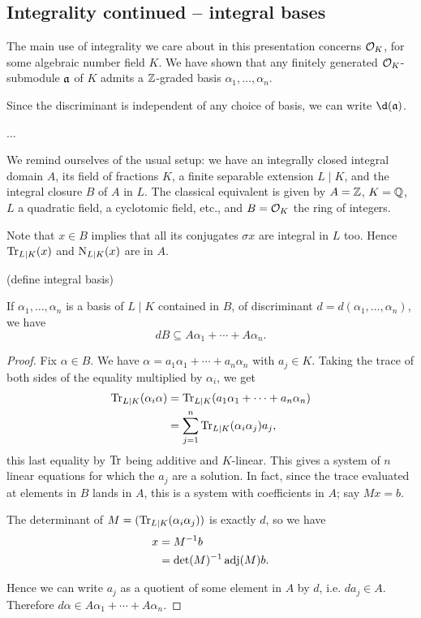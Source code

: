 \subsection{Integrality continued -- integral bases}


The main use of integrality we care about in this presentation concerns $\mathcal{O}_K$, for some algebraic number field $K$. We have shown that any finitely generated $\mathcal{O}_K$-submodule $\mathfrak{a}$ of $K$ admits a $\mathbb{Z}$-graded basis $\alpha_1,\dots,\alpha_n$.

Since the discriminant is independent of any choice of basis, we can write $\d(\fraka)$.

...

We remind ourselves of the usual setup: we have an integrally closed integral domain $A$, its field of fractions $K$, a finite separable extension $L\mid K$, and the integral closure $B$ of $A$ in $L$. The classical equivalent is given by $A=\mathbb{Z}$, $K=\mathbb{Q}$, $L$ a quadratic field, a cyclotomic field, etc., and $B=\mathcal{O}_K$ the ring of integers.

Note that $x\in B$ implies that all its conjugates $\sigma x$ are integral in $L$ too. Hence $\operatorname{Tr}_{L\mid K}(x)$ and $\operatorname{N}_{L\mid K}(x)$ are in $A$.

(define integral basis)

\begin{lemma}
	If $\alpha_1,\dots,\alpha_n$ is a basis of $L\mid K$ contained in $B$, of discriminant $d=d(\alpha_1,\dots,\alpha_n)$, we have
	\[
		dB\subseteq A\alpha_1 + \cdots + A\alpha_n.
	\]
\end{lemma}
\begin{proof}
	Fix $\alpha\in B$. We have $\alpha=a_1\alpha_1+\cdots+a_n\alpha_n$ with $a_j\in K$. Taking the trace of both sides of the equality multiplied by $\alpha_i$, we get
	\begin{align*}
		\operatorname{Tr}_{L\mid K}(\alpha_i \alpha) &= \operatorname{Tr}_{L\mid K}(a_1\alpha_1+\cdots+a_n\alpha_n)\\
			&= \sum_{j=1}^n \operatorname{Tr}_{L\mid K}(\alpha_i\alpha_j) a_j,
	\end{align*}
	this last equality by $\operatorname{Tr}$ being additive and $K$-linear. This gives a system of $n$ linear equations for which the $a_j$ are a solution. In fact, since the trace evaluated at elements in $B$ lands in $A$, this is a system with coefficients in $A$; say $Mx=b$.

	The determinant of $M=(\operatorname{Tr}_{L\mid K}(\alpha_i\alpha_j))$ is exactly $d$, so we have
	\begin{align*}
		x &= M^{-1} b\\
		  &= \det(M)^{-1}\operatorname{adj}(M)b.
	\end{align*}
	
	Hence we can write $a_j$ as a quotient of some element in $A$ by $d$, i.e. $da_j\in A$. Therefore $d\alpha\in A\alpha_1+\cdots+A\alpha_n$.
\end{proof}


